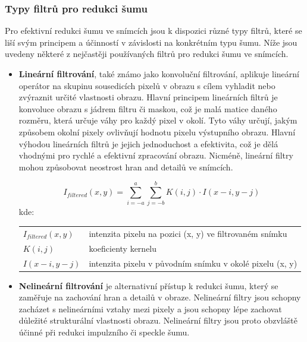 \documentclass[male,czech,api_ing]{thesis}
\makeatletter
\newenvironment{conditions}[1][kde:]
    {#1 \begin{tabular}[t]{>{$}l<{$} @{${}={}$} >{\raggedright\arraybackslash}p{10cm}}}
    {\end{tabular}}
\makeatother
\begin{document}
\subsubsection{Typy filtrů pro redukci šumu}
Pro efektivní redukci šumu ve snímcích jsou k dispozici různé typy filtrů, které se liší svým principem a účinností v závislosti na konkrétním typu šumu. Níže jsou uvedeny některé z nejčastěji používaných filtrů pro redukci šumu ve snímcích.

\begin{itemize}
    \item \textbf{Lineární filtrování}, také známo jako konvoluční filtrování, aplikuje lineární operátor na skupinu sousedicích pixelů v obrazu s cílem vyhladit nebo zvýraznit určité vlastnosti obrazu. Hlavní principem lineárních filtrů je konvoluce obrazu s jádrem filtru či maskou, což je malá matice daného rozměru, která určuje váhy pro každý pixel v okolí. Tyto váhy určují, jakým způsobem okolní pixely ovlivňují hodnotu pixelu výstupního obrazu. Hlavní výhodou lineárních filtrů je jejich jednoduchost a efektivita, což je dělá vhodnými pro rychlé a efektivní zpracování obrazu. Nicméně, lineární filtry mohou způsobovat neostrost hran and detailů ve snímcích. \cite{ImageDenoisingTechniques, XRayImageProcessing}
    
    \begin{equation}
        I_{filtered}(x, y) = \sum_{i=-a}^{a} \sum_{j=-b}^{b} K(i, j) \cdot I(x-i, y-j)
    \end{equation}
    \begin{conditions}
        I_{filtered}(x, y) & intenzita pixelu na pozici (x, y) ve filtrovaném snímku \\
        K(i, j) & koeficienty kernelu \\
        I(x-i, y-j) & intenzita pixelu v původním snímku v okolé pixelu (x, y) 
    \end{conditions}
    \item \textbf{Nelineární filtrování} je alternativní přístup k redukci šumu, který se zaměřuje na zachování hran a detailů v obraze. Nelineární filtry jsou schopny zacházet s nelineárními vztahy mezi pixely a jsou schopny lépe zachovat důležité strukturální vlastnosti obrazu. Nelineární filtry jsou proto obzvláště účinné při redukci impulzního či speckle šumu. \cite{ImageDenoisingTechniques, XRayImageProcessing}
\end{itemize}
\end{document}
